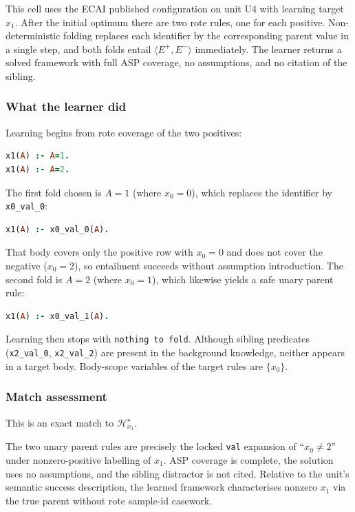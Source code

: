 \documentclass[11pt]{article}
\begin{document}
This cell uses the ECAI published configuration on unit U4 with learning target \(x_1\). After the initial optimum there are two rote rules, one for each positive. Non-deterministic folding replaces each identifier by the corresponding parent value in a single step, and both folds entail \(\langle E^+,E^-\rangle\) immediately. The learner returns a solved framework with full ASP coverage, no assumptions, and no citation of the sibling.

\subsubsection{What the learner did}

Learning begins from rote coverage of the two positives:

\begin{lstlisting}[style=logic,language=Prolog]
x1(A) :- A=1.
x1(A) :- A=2.
\end{lstlisting}

The first fold chosen is \(A=1\) (where \(x_0=0\)), which replaces the identifier by \texttt{x0\_val\_0}:

\begin{lstlisting}[style=logic,language=Prolog]
x1(A) :- x0_val_0(A).
\end{lstlisting}

That body covers only the positive row with \(x_0=0\) and does not cover the negative (\(x_0=2\)), so entailment succeeds without assumption introduction. The second fold is \(A=2\) (where \(x_0=1\)), which likewise yields a safe unary parent rule:

\begin{lstlisting}[style=logic,language=Prolog]
x1(A) :- x0_val_1(A).
\end{lstlisting}

Learning then stops with \texttt{nothing to fold}. Although sibling predicates (\texttt{x2\_val\_0}, \texttt{x2\_val\_2}) are present in the background knowledge, neither appears in a target body. Body-scope variables of the target rules are \(\{x_0\}\).

\subsubsection{Match assessment}

This is an exact match to \(\mathcal{H}_{x_1}^\star\).

The two unary parent rules are precisely the locked \texttt{val} expansion of ``\(x_0\neq 2\)'' under nonzero-positive labelling of \(x_1\). ASP coverage is complete, the solution uses no assumptions, and the sibling distractor is not cited. Relative to the unit's semantic success description, the learned framework characterises nonzero \(x_1\) via the true parent without rote sample-id casework.
\end{document}
